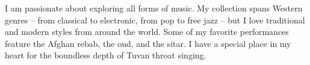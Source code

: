 \documentclass{report}
\begin{document}






  \noindent \small I am passionate about exploring all forms of music. My collection spans Western genres -- from classical to electronic, from pop to free jazz -- but I love traditional and modern styles from around the world. Some of my favorite performances feature the Afghan rebab, the oud, and the sitar. I have a special place in my heart for the boundless depth of Tuvan throat singing.
\end{document}
